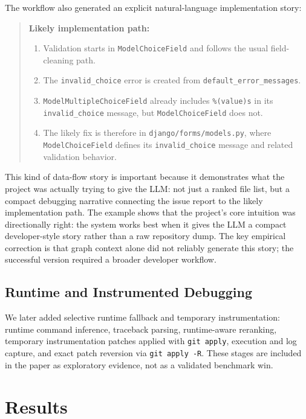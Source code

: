 \documentclass[11pt]{article}
\begin{document}
The workflow also generated an explicit natural-language implementation story:

\begin{quote}
\small
\textbf{Likely implementation path:}
\begin{enumerate}
\item Validation starts in \texttt{ModelChoiceField} and follows the usual field-cleaning path.
\item The \texttt{invalid\_choice} error is created from \texttt{default\_error\_messages}.
\item \texttt{ModelMultipleChoiceField} already includes \texttt{\%(value)s} in its \texttt{invalid\_choice} message, but \texttt{ModelChoiceField} does not.
\item The likely fix is therefore in \texttt{django/forms/models.py}, where \texttt{ModelChoiceField} defines its \texttt{invalid\_choice} message and related validation behavior.
\end{enumerate}
\end{quote}

This kind of data-flow story is important because it demonstrates what the project was actually trying to give the LLM: not just a ranked file list, but a compact debugging narrative connecting the issue report to the likely implementation path. The example shows that the project’s core intuition was directionally right: the system works best when it gives the LLM a compact developer-style story rather than a raw repository dump. The key empirical correction is that graph context alone did not reliably generate this story; the successful version required a broader developer workflow.

\subsection{Runtime and Instrumented Debugging}

We later added selective runtime fallback and temporary instrumentation: runtime command inference, traceback parsing, runtime-aware reranking, temporary instrumentation patches applied with \texttt{git apply}, execution and log capture, and exact patch reversion via \texttt{git apply -R}. These stages are included in the paper as exploratory evidence, not as a validated benchmark win.

\section{Results}
\end{document}
